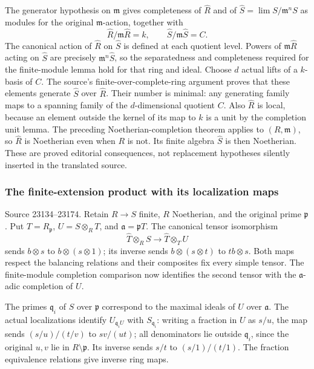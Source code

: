 The generator hypothesis on \(\mathfrak m\) gives completeness of \(\widehat R\) and of \(\widehat S=\lim S/\mathfrak m^nS\) as modules for the original \(\mathfrak m\)-action, together with \[
\widehat R/\mathfrak m\widehat R=k,\qquad
\widehat S/\mathfrak m\widehat S=C.
\] The canonical action of \(\widehat R\) on \(\widehat S\) is defined at each quotient level. Powers of \(\mathfrak m\widehat R\) acting on \(\widehat S\) are precisely \(\mathfrak m^n\widehat S\), so the separatedness and completeness required for the finite-module lemma hold for that ring and ideal. Choose \(d\) actual lifts of a \(k\)-basis of \(C\). The source's finite-over-complete-ring argument proves that these elements generate \(\widehat S\) over \(\widehat R\). Their number is minimal: any generating family maps to a spanning family of the \(d\)-dimensional quotient \(C\). Also \(\widehat R\) is local, because an element outside the kernel of its map to \(k\) is a unit by the completion unit lemma. The preceding Noetherian-completion theorem applies to \((R,\mathfrak m)\), so \(\widehat R\) is Noetherian even when \(R\) is not. Its finite algebra \(\widehat S\) is then Noetherian. These are proved editorial consequences, not replacement hypotheses silently inserted in the translated source.

\subsubsection{The finite-extension product with its localization maps}\label{algebra-proof-015-the-finite-extension-product-with-its-localization-maps}

Source 23134--23174. Retain \(R\to S\) finite, \(R\) Noetherian, and the original prime \(\mathfrak p\). Put \(T=R_{\mathfrak p}\), \(U=S\otimes_R T\), and \(\mathfrak a=\mathfrak pT\). The canonical tensor isomorphism \[
\widehat T\otimes_R S
 \longrightarrow\widehat T\otimes_T U
\] sends \(b\otimes s\) to \(b\otimes(s\otimes1)\); its inverse sends \(b\otimes(s\otimes t)\) to \(tb\otimes s\). Both maps respect the balancing relations and their composites fix every simple tensor. The finite-module completion comparison now identifies the second tensor with the \(\mathfrak a\)-adic completion of \(U\).

The primes \(\mathfrak q_i\) of \(S\) over \(\mathfrak p\) correspond to the maximal ideals of \(U\) over \(\mathfrak a\). The actual localizations identify \(U_{\mathfrak q_iU}\) with \(S_{\mathfrak q_i}\): writing a fraction in \(U\) as \(s/u\), the map sends \((s/u)/(t/v)\) to \(sv/(ut)\); all denominators lie outside \(\mathfrak q_i\), since the original \(u,v\) lie in \(R\setminus\mathfrak p\). Its inverse sends \(s/t\) to \((s/1)/(t/1)\). The fraction equivalence relations give inverse ring maps.

